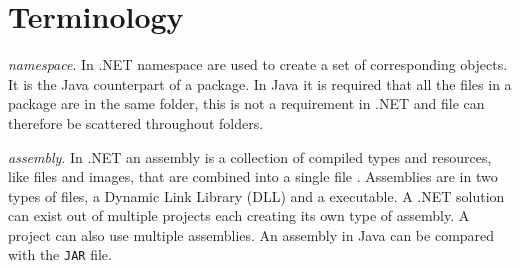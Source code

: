 \chapter{Terminology}

\textit{namespace}. In .NET namespace are used to create a set of corresponding objects. It is the Java counterpart of a package. In Java it is required that all the files in a package are in the same folder, this is not a requirement in .NET and file can therefore be scattered throughout folders. 

\textit{assembly}. In .NET an assembly is a collection of compiled types and resources, like files and images, that are combined into a single file \cite{assembly-net}. Assemblies are in two types of files, a Dynamic Link Library (DLL) and a executable. A .NET solution can exist out of multiple projects each creating its own type of assembly. A project can also use multiple assemblies. An assembly in Java can be compared with the \verb|JAR| file.